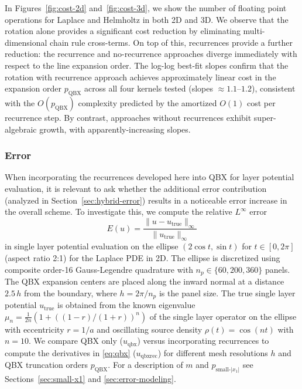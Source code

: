 \documentclass[12pt]{article}
\theoremstyle{definition}
\theoremstyle{plain}
\theoremstyle{definition}
\begin{document}
In Figures~\ref{fig:cost-2d} and~\ref{fig:cost-3d}, we show the number of floating point operations for Laplace and Helmholtz in both 2D and 3D. We observe that the rotation alone provides a significant cost reduction by eliminating multi-dimensional chain rule cross-terms. On top of this, recurrences provide a further reduction: the recurrence and no-recurrence approaches diverge immediately with respect to the line expansion order. The log-log best-fit slopes confirm that the rotation with recurrence approach achieves approximately linear cost in the expansion order $p_{\text{QBX}}$ across all four kernels tested (slopes $\approx 1.1$--$1.2$), consistent with the $O(p_{\text{QBX}})$ complexity predicted by the amortized $O(1)$ cost per recurrence step. By contrast, approaches without recurrences exhibit super-algebraic growth, with apparently-increasing slopes.

\subsubsection{Error}

When incorporating the recurrences developed here into QBX for layer potential evaluation, it is relevant to ask whether the additional error contribution (analyzed in Section~\ref{sec:hybrid-error}) results in a noticeable error increase in the overall scheme. To investigate this, we compute the relative $L^\infty$ error
\begin{equation}
\label{eq:qbx-error}
E(u) = \frac{\|u - u_{\text{true}}\|_\infty}{\|u_{\text{true}}\|_\infty}
\end{equation}
in single layer potential evaluation on the ellipse $(2\cos t, \sin t)$ for $t \in [0, 2\pi]$ (aspect ratio 2:1) for the Laplace PDE in 2D. The ellipse is discretized using composite order-16 Gauss-Legendre quadrature with $n_p \in \{60, 200, 360\}$ panels. The QBX expansion centers are placed along the inward normal at a distance $2.5\,h$ from the boundary, where $h = 2\pi/n_p$ is the panel size. The true single layer potential $u_{\text{true}}$ is obtained from the known eigenvalue $\mu_n = \frac{1}{2n}(1 + ((1-r)/(1+r))^n)$ of the single layer operator on the ellipse with eccentricity $r = 1/a$ and oscillating source density $\rho(t) = \cos(nt)$ with $n=10$. We compare QBX only ($u_{\text{qbx}}$) versus incorporating recurrences to compute the derivatives in \eqref{eq:qbx} ($u_{\text{qbxrec}}$) for different mesh resolutions $h$ and QBX truncation orders $p_{\text{QBX}}$. For a description of $m$ and $p_{\text{small-$|x_1|$}}$ see Sections~\ref{sec:small-x1} and \ref{sec:error-modeling}.
\end{document}
